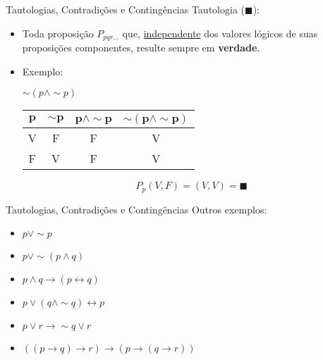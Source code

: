 

\begin{frame}[t]{Tautologias, Contradições e Contingências} %
	Tautologia ($\blacksquare$):
	\begin{itemize}
	\item Toda proposição $P_{pqr\ldots}$ que, \underline{independente} dos valores lógicos de suas proposições componentes, resulte sempre em {\bf verdade}.
	\item Exemplo: \begin{center}$\sim (p \wedge \sim p)$ \end{center}

	\vskip 1cm
	
	\begin{center}
	\begin{tabular}{|c|c|c|c|}
	\hline
	$\mathbf{p}$ & $\mathbf{\sim p}$ & $\mathbf{p \wedge \sim p}$ & $\mathbf{\sim(p \wedge\sim p)}$ \\
	\hline
	V & F & F & V \\
	\hline
	F & V & F & V \\
	\hline
	\end{tabular}
	\end{center}

	$$P_p(V, F) = (V, V) = \blacksquare$$
	\end{itemize}
\end{frame}

\begin{frame}[t]{Tautologias, Contradições e Contingências} %
	Outros exemplos:
	\begin{itemize}
	\item $p \vee\sim p$
	\item $p \vee\sim (p \wedge q)$
	\item $p \wedge q \rightarrow (p \leftrightarrow q)$
	\item $p \vee (q \wedge\sim q) \leftrightarrow p$
	\item $p \vee r \rightarrow \sim q \vee r$
	\item $((p \rightarrow q) \rightarrow r) \rightarrow (p \rightarrow (q \rightarrow r))$
	\end{itemize}
\end{frame}

